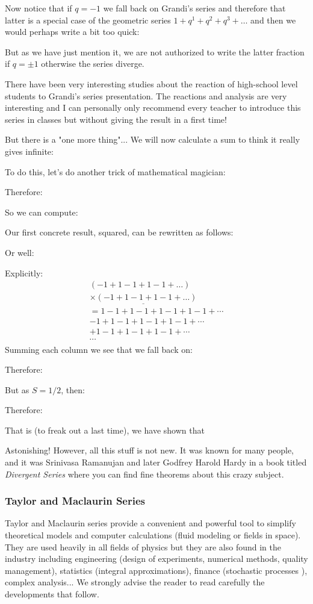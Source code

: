 	Now notice that if $q=-1$ we fall back on Grandi's series and therefore that latter is a special case of the geometric series $1+q^1+q^2+q^3+\ldots$ and then we would perhaps write a bit too quick:
	
	But as we have just mention it, we are not authorized to write the latter fraction if $q=\pm 1$ otherwise the series diverge. 
	\begin{tcolorbox}[title=Remark,colframe=black,arc=10pt]
	There have been very interesting studies about the reaction of high-school level students to Grandi's series presentation. The reactions and analysis are very interesting and I can personally only recommend every teacher to introduce this series in classes but without giving the result in a first time!
	\end{tcolorbox}
	But there is a "one more thing"... We will now calculate a sum to think it really gives infinite:

	
	To do this, let's do another trick of mathematical magician:
	
	Therefore:
	
	So we can compute:
	
	Our first concrete result, squared, can be rewritten as follows:

	
	Or well:
	
	Explicitly:
   \begin{eqnarray*}
	   (-1 + 1-1 + 1-1 + \ldots)\\
	   \underline{\times (-1 + 1-1 + 1-1 + \ldots)} \\
	    =1-1 + 1-1 + 1-1 + 1-1 + \cdots \\ -1 + 1-1 + 1-1 + 1-1 + \cdots\\ + 1-1 + 1-1 + 1-1 + \cdots\\ \cdots
	\end{eqnarray*}
	Summing each column we see that we fall back on:
   
	Therefore:
	
   But as $S = 1/2$, then:
   
   Therefore:
   
   That is (to freak out a last time), we have shown that
   
	Astonishing! However, all this stuff is not new. It was known for many people, and it was Srinivasa Ramanujan and later Godfrey Harold Hardy in a book titled \textit{Divergent Series} where you can find fine theorems about this crazy subject.
	
	\pagebreak
	\subsubsection{Taylor and Maclaurin Series}
	Taylor and Maclaurin series provide a convenient and powerful tool to simplify theoretical models and computer calculations (fluid modeling or fields in space). They are used heavily in all fields of physics but they are also found in the industry including engineering (design of experiments, numerical methods, quality management), statistics (integral approximations), finance (stochastic processes ), complex analysis... We strongly advise the reader to read carefully the developments that follow.
	
